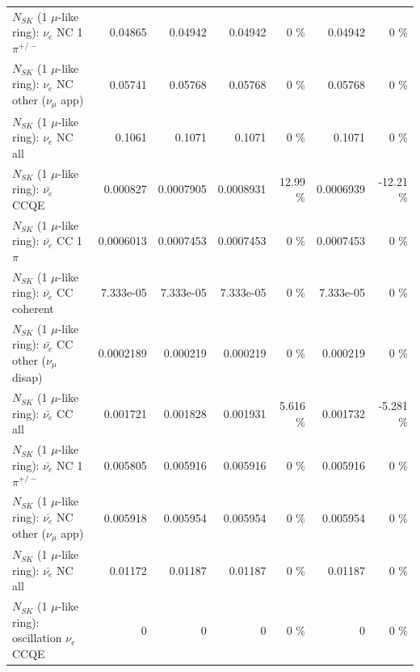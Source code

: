 \begin{table}
\begin{tabular}{| l | r | r | r  r | r  r |}
\hline
                           $N_{SK}$ (1 $\mu$-like ring): $\nu_e$ NC 1$\pi^{+/-}$ &         0.04865 &         0.04942 &         0.04942 &        0 \%  &         0.04942 &        0 \%  \\ 
                  $N_{SK}$ (1 $\mu$-like ring): $\nu_e$ NC other ($\nu_\mu$ app) &         0.05741 &         0.05768 &         0.05768 &        0 \%  &         0.05768 &        0 \%  \\ 
                                  $N_{SK}$ (1 $\mu$-like ring): $\nu_{e}$ NC all &          0.1061 &          0.1071 &          0.1071 &        0 \%  &          0.1071 &        0 \%  \\ 
\hline
\hline
\hline
                                $N_{SK}$ (1 $\mu$-like ring): $\bar{\nu_e}$ CCQE &        0.000827 &       0.0007905 &       0.0008931 &    12.99 \%  &       0.0006939 &   -12.21 \%  \\ 
                           $N_{SK}$ (1 $\mu$-like ring): $\bar{\nu_e}$ CC 1$\pi$ &       0.0006013 &       0.0007453 &       0.0007453 &        0 \%  &       0.0007453 &        0 \%  \\ 
                         $N_{SK}$ (1 $\mu$-like ring): $\bar{\nu_e}$ CC coherent &       7.333e-05 &       7.333e-05 &       7.333e-05 &        0 \%  &       7.333e-05 &        0 \%  \\ 
          $N_{SK}$ (1 $\mu$-like ring): $\bar{\nu_e}$ CC other ($\nu_\mu$ disap) &       0.0002189 &        0.000219 &        0.000219 &        0 \%  &        0.000219 &        0 \%  \\ 
                            $N_{SK}$ (1 $\mu$-like ring): $\bar{\nu_{e}}$ CC all &        0.001721 &        0.001828 &        0.001931 &    5.616 \%  &        0.001732 &   -5.281 \%  \\ 
\hline
                     $N_{SK}$ (1 $\mu$-like ring): $\bar{\nu_e}$ NC 1$\pi^{+/-}$ &        0.005805 &        0.005916 &        0.005916 &        0 \%  &        0.005916 &        0 \%  \\ 
            $N_{SK}$ (1 $\mu$-like ring): $\bar{\nu_e}$ NC other ($\nu_\mu$ app) &        0.005918 &        0.005954 &        0.005954 &        0 \%  &        0.005954 &        0 \%  \\ 
                            $N_{SK}$ (1 $\mu$-like ring): $\bar{\nu_{e}}$ NC all &         0.01172 &         0.01187 &         0.01187 &        0 \%  &         0.01187 &        0 \%  \\ 
\hline
\hline
\hline
                          $N_{SK}$ (1 $\mu$-like ring): oscillation $\nu_e$ CCQE &               0 &               0 &               0 &        0 \%  &               0 &        0 \%  \\ 

\end{tabular}
\end{table}
